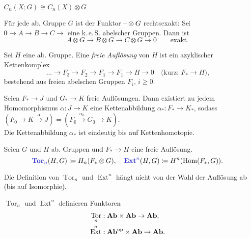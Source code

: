 \documentclass{cheat-sheet}
\DeclareMathOperator{\Tor}{Tor}
\DeclareMathOperator{\Ext}{Ext}
\newcommand{\keS}{k.\,e.\,S.} %
\begin{document}

\begin{bem}
  $C_n(X; G) \cong C_n(X) \otimes G$
\end{bem}


\begin{prop}
  Für jede ab. Gruppe $G$ ist der Funktor $\text{--} \otimes G$ rechtsexakt:
  Sei $0 \to A \to B \to C \to$ eine \keS{} abelscher Gruppen. Dann ist
  \[
    A \otimes G \to B \otimes G \to C \otimes G \to 0
    \qquad \text{exakt.}
  \]
\end{prop}

\begin{defn}
  Sei $H$ eine ab. Gruppe. Eine \emph{freie Auflösung} von $H$ ist ein azyklischer Kettenkomplex
  \[
    \ldots \to F_3 \to F_2 \to F_1 \to F_1 \to H \to 0
    \quad \text{(kurz: $F_* \to H$),}
  \]
  bestehend aus freien abelschen Gruppen $F_i$, $i \geq 0$.
\end{defn}

\begin{prop}
  Seien $F_* \to J$ und $G_* \to K$ freie Auflösungen. Dann existiert zu jedem Homomorphismus $\alpha : J \to K$ eine Kettenabbildung $\alpha_* : F_* \to K_*$, sodass
  $(F_0 \to K \xrightarrow{\alpha} J) = (F_0 \xrightarrow{\alpha_0} G_0 \to K)$.\\
  Die Kettenabbildung $\alpha_*$ ist eindeutig bis auf Kettenhomotopie.
\end{prop}

\begin{defn}
  Seien $G$ und $H$ ab. Gruppen und $F_* \to H$ eine freie Auflösung.
  \[
    \text{\emph{$\mathrm{\mathbf{Tor}}_n$}}(H, G) \coloneqq H_n(F_* \otimes G), \quad
    \text{\emph{$\mathrm{\mathbf{Ext}}^n$}}(H, G) \coloneqq H^n(\Hom(F_*, G)).
  \]
\end{defn}

\begin{prop}
  Die Definition von $\Tor_n$ und $\Ext^n$ hängt nicht von der Wahl der Auflösung ab (bis auf Isomorphie).
\end{prop}

\begin{prop}
  $\Tor_n$ und $\Ext^n$ definieren Funktoren
  \begin{align*}
    \Tor_n &: \AbGrp \times \AbGrp \to \AbGrp, \\
    \Ext^n &: \AbGrp^\op \times \AbGrp \to \AbGrp.
  \end{align*}
\end{prop}
\end{document}
